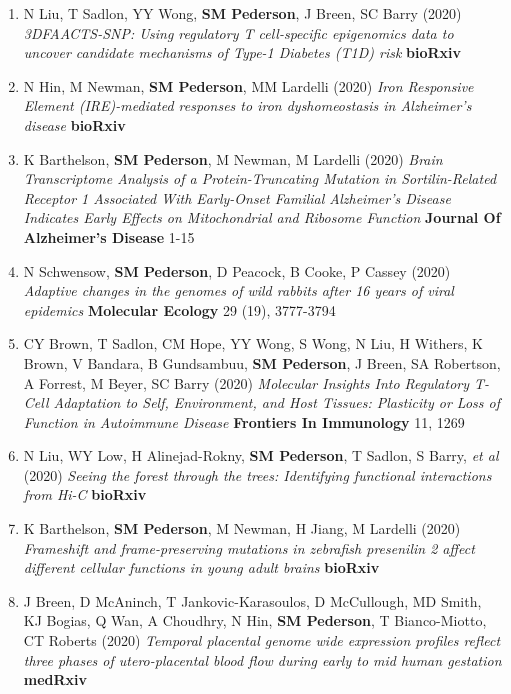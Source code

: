 \documentclass[11pt,a4paper,]{moderncv}
\begin{document}
\begin{enumerate}
     \item N Liu, T Sadlon, YY Wong, \textbf{SM Pederson}, J Breen, SC Barry (2020) \emph{3DFAACTS-SNP: Using regulatory T cell-specific epigenomics data to uncover candidate mechanisms of Type-1 Diabetes (T1D) risk} \textbf{bioRxiv}  \\[-3mm] 
     \item N Hin, M Newman, \textbf{SM Pederson}, MM Lardelli (2020) \emph{Iron Responsive Element (IRE)-mediated responses to iron dyshomeostasis in Alzheimer's disease} \textbf{bioRxiv}  \\[-3mm] 
     \item K Barthelson, \textbf{SM Pederson}, M Newman, M Lardelli (2020) \emph{Brain Transcriptome Analysis of a Protein-Truncating Mutation in Sortilin-Related Receptor 1 Associated With Early-Onset Familial Alzheimer's Disease Indicates Early Effects on Mitochondrial and Ribosome Function} \textbf{Journal Of Alzheimer's Disease} 1-15 \\[-3mm] 
     \item N Schwensow, \textbf{SM Pederson}, D Peacock, B Cooke, P Cassey (2020) \emph{Adaptive changes in the genomes of wild rabbits after 16 years of viral epidemics} \textbf{Molecular Ecology} 29 (19), 3777-3794 \\[-3mm] 
     \item CY Brown, T Sadlon, CM Hope, YY Wong, S Wong, N Liu, H Withers, K Brown, V Bandara, B Gundsambuu, \textbf{SM Pederson}, J Breen, SA Robertson, A Forrest, M Beyer, SC Barry (2020) \emph{Molecular Insights Into Regulatory T-Cell Adaptation to Self, Environment, and Host Tissues: Plasticity or Loss of Function in Autoimmune Disease} \textbf{Frontiers In Immunology} 11, 1269 \\[-3mm] 
     \item N Liu, WY Low, H Alinejad-Rokny, \textbf{SM Pederson}, T Sadlon, S Barry, \emph{et al} (2020) \emph{Seeing the forest through the trees: Identifying functional interactions from Hi-C} \textbf{bioRxiv}  \\[-3mm] 
     \item K Barthelson, \textbf{SM Pederson}, M Newman, H Jiang, M Lardelli (2020) \emph{Frameshift and frame-preserving mutations in zebrafish presenilin 2 affect different cellular functions in young adult brains} \textbf{bioRxiv}  \\[-3mm] 
     \item J Breen, D McAninch, T Jankovic-Karasoulos, D McCullough, MD Smith, KJ Bogias, Q Wan, A Choudhry, N Hin, \textbf{SM Pederson}, T Bianco-Miotto, CT Roberts (2020) \emph{Temporal placental genome wide expression profiles reflect three phases of utero-placental blood flow during early to mid human gestation} \textbf{medRxiv}  \\[-3mm] 

\end{enumerate}
\end{document}
